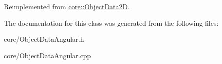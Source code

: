 Reimplemented from \hyperlink{classcore_1_1ObjectData2D_aff4e8539559f4ce50a7f43b733d6c512}{core\+::\+Object\+Data2D}.



The documentation for this class was generated from the following files\+:\begin{DoxyCompactItemize}
\item 
core/Object\+Data\+Angular.\+h\item 
core/Object\+Data\+Angular.\+cpp\end{DoxyCompactItemize}
